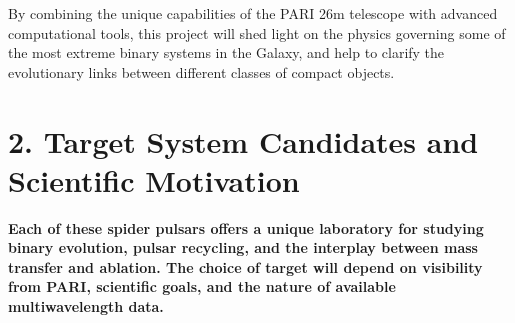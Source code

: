 \documentclass[12pt]{article}
\begin{document}
By combining the unique capabilities of the PARI 26m telescope with advanced computational tools, this project will shed light on the physics governing some of the most extreme binary systems in the Galaxy, and help to clarify the evolutionary links between different classes of compact objects.

\section*{2. Target System Candidates and Scientific Motivation}

\vspace{0.5em}
\noindent \textbf{Each of these spider pulsars offers a unique laboratory for studying binary evolution, pulsar recycling, and the interplay between mass transfer and ablation. The choice of target will depend on visibility from PARI, scientific goals, and the nature of available multiwavelength data.}
\end{document}

